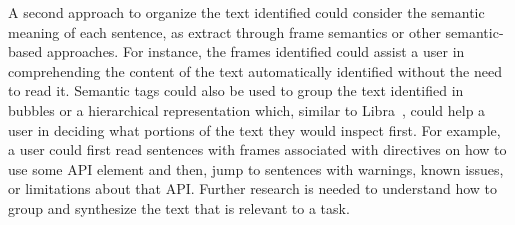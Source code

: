 A second approach to organize the text identified could consider 
the semantic meaning of each sentence, as extract through frame semantics or other semantic-based approaches. 
For instance, the frames identified could 
assist a user in comprehending the content of the text automatically identified
without the need to read it. 
Semantic tags could also be used to group the text identified in bubbles or a hierarchical representation 
which, similar to Libra~\cite{Ponzanelli2017}, could help a user 
in deciding what portions of the text they would inspect first. 
For example, a user could first read sentences 
with frames associated with directives on how
to use some API element and then, 
jump to sentences with warnings, known issues,
or limitations about that API. 
Further research is needed to understand how to group and synthesize the text
that is relevant to a task. 













